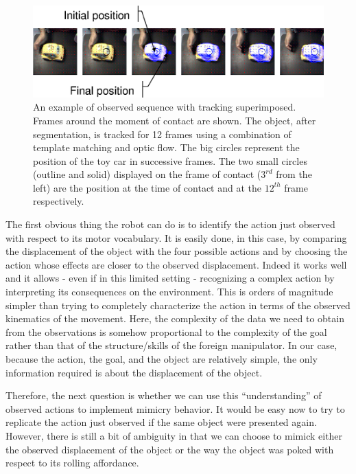 \begin{figure}[tbh]
\begin{center}
\includegraphics[width=\columnwidth]{observed-action.eps}
\caption{ 
\label{fig:observed-action}
%
An example of observed sequence with tracking superimposed. Frames around the
moment of contact are shown. The object, after segmentation, is tracked for 12 
frames using a combination of template matching and optic flow. The big circles
represent the position of the toy car in successive frames. The two small circles
(outline and solid) displayed on the frame of contact ($3^{rd}$ from the left) are 
the position at the time of contact and at the $12^{th}$ frame respectively.
%
}
\end{center}
\end{figure}

The first obvious thing the robot can do is to identify the action just observed 
with respect to its motor vocabulary. It is easily done, in this case, by comparing 
the displacement of the object with the four possible actions and by choosing the
action whose effects are closer to the observed displacement.
Indeed it works well and it allows - even if in this limited setting - recognizing 
a complex action by interpreting its consequences on the environment.
This is orders of magnitude simpler than trying to completely characterize the
action in terms of the observed kinematics of the movement. Here, the complexity
of the data we need to obtain from the observations is somehow proportional to the complexity
of the goal rather than that of the structure/skills of the foreign manipulator. In our case, because 
the action, the goal, and the object are relatively simple, the only information 
required is about the displacement of the object. 

Therefore, the next question is whether we can use this ``understanding'' of 
observed actions to implement mimicry behavior. It 
would be easy now to try to replicate the action just observed if the same
object were presented again. However, there is still a bit of ambiguity in that
we can choose to mimick either the observed displacement of the object or 
the way the object was poked with respect to its rolling affordance.
 

